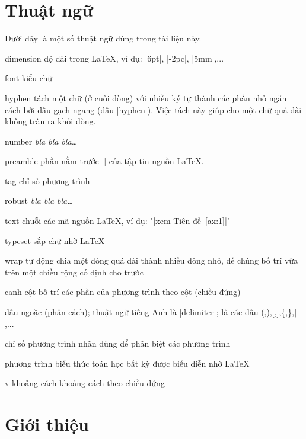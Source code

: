 \tableofcontents

\cleardoublepage %



\chapter{Thuật ngữ}

Dưới đây là một số thuật ngữ dùng trong tài liệu này.

\medskip
\begin{lentry}
\item[dimension] độ dài trong \LaTeX{}, ví dụ: |6pt|, |-2pc|, |5mm|,...
\item[font]kiểu chữ
\item[hyphen]tách một chữ (ở cuối dòng) với nhiều ký tự thành các phần nhỏ
	ngăn cách bởi dấu gạch ngang (dấu |hyphen|).
	Việc tách này giúp cho một chữ quá dài không tràn ra khỏi dòng.
\item[number] \emph{bla bla bla\ldots}
\item[preamble] phần nằm trước || của tập tin nguồn \LaTeX{}.
\item[tag] chỉ số phương trình
\item[robust]\emph{bla bla bla\ldots}
\item[text] chuỗi các mã nguồn \LaTeX{}, ví dụ: "|xem Tiên đề~\ref{ax:1}|"
\item[typeset] sắp chữ nhờ \LaTeX{}
\item[wrap] tự động chia một dòng quá dài thành nhiều dòng nhỏ, để chúng
	bố trí vừa trên một chiều rộng cố định cho trước
\item[canh cột]bố trí các phần của phương trình theo cột (chiều đứng)
\item[dấu ngoặc](phân cách); thuật ngữ tiếng Anh là |delimiter|; là các dấu
	(,),[,],\{,\},$\vert$,...
\item[chỉ số phương trình]nhãn dùng để phân biệt các phương trình
\item[phương trình] biểu thức toán học bất kỳ được biểu diễn nhờ \LaTeX{}
\item[v-khoảng cách] khoảng cách theo chiều đứng
\end{lentry}

\chapter{Giới thiệu}

